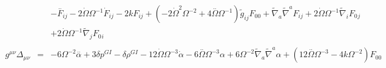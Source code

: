 \documentclass[10pt,letterpaper]{article}
\numberwithin{equation}{section}
\begin{document}
\begin{eqnarray}
&& - \overset{..}{F}_{ij} - 2 \dot{\Omega} \Omega^{-1} \dot{F}_{ij} - 2 k F_{ij} + (-2 \dot{\Omega}^2 \Omega^{-2} + 4 \overset{..}{\Omega} \Omega^{-1}) \tilde{g}_{ij} F_{00}{} + \tilde{\nabla}_{a}\tilde{\nabla}^{a}F_{ij} + 2 \dot{\Omega} \Omega^{-1} \tilde{\nabla}_{i}F_{0}{}_{j} \nonumber \\ 
&& + 2 \dot{\Omega} \Omega^{-1} \tilde{\nabla}_{j}F_{0}{}_{i}
\\  \nonumber\\ 
g^{\mu\nu}\Delta_{\mu\nu}&=& -6 \Omega^{-2} \overset{..}{\alpha} + 3 \delta p^{GI}{} -  \delta \rho^{GI}{} - 12 \dot{\Omega} \Omega^{-3} \dot{\alpha} - 6 \overset{..}{\Omega} \Omega^{-3} \alpha + 6 \Omega^{-2} \tilde{\nabla}_{a}\tilde{\nabla}^{a}\alpha +(12 \overset{..}{\Omega} \Omega^{-3} - 4 k \Omega^{-2}) F_{00}{}
\end{eqnarray}
%
%
\end{document}
